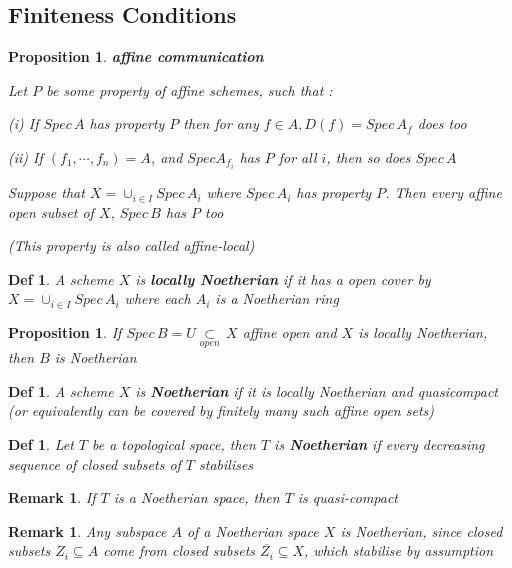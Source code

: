 \documentclass{article}
\newtheorem{definition}[theorem]{Def}
\newtheorem{proposition}[theorem]{Proposition}
\newtheorem{remark}[theorem]{Remark}
\begin{document}
\newpage
\subsection{Finiteness Conditions}

\begin{proposition}
    \textbf{affine communication}

Let $P$ be some property of
affine schemes, such that :

(i) If $Spec\, A$ has property $P$ then for any $f \in A,
D(f)=Spec\, A_f$ does too

(ii) If $(f_1,\cdots, f_n) = A$, and $Spec A_{f_i}$ has $P$ for all $i$, then so does $Spec\, A$

Suppose that $X = \cup_{i\in I} Spec\, A_i$ where $Spec\, A_i$ has property $P$. Then every affine open
subset of $X$, $Spec\, B$ has $P$ too

(This property is also called affine-local)
\end{proposition}

\begin{definition}
    A scheme $X$ is \textbf{locally Noetherian} if it has a open cover by $X=\cup_{i\in I} Spec\, A_i$ where each $A_i$ is a Noetherian ring
\end{definition}

\begin{proposition}
    If $Spec\, B=U\mathop{\subset}\limits_{open}
    \,X$ affine open and $X$ is locally Noetherian, then $B$ is Noetherian
\end{proposition}

\begin{definition}
    A scheme $X$ is \textbf{Noetherian} if it is locally Noetherian and quasicompact (or equivalently can be covered by finitely many such affine open sets)
\end{definition}

\begin{definition}
    Let $T$ be a topological space, then $T$ is \textbf{Noetherian} if every decreasing sequence of closed subsets of $T$ stabilises
\end{definition}

\begin{remark}
    If $T$ is a Noetherian space, then $T$ is quasi-compact
\end{remark}

\begin{remark}
    Any subspace $A$ of a Noetherian space $X$ is Noetherian, since closed subsets $Z_i \subseteq A$ come from closed subsets $\overline{Z_i} \subseteq X$, which stabilise by assumption
\end{remark}
\end{document}
